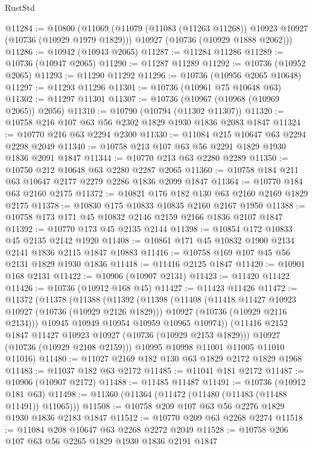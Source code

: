 \begin{lexlean}{RustStd}
\begin{coremodule}
@11284 := @10800
    (@11069
      (@11079 (@11083 (@11263 @11268)) @10923 @10927 (@10736 (@10929 @1979 @1829)))
      @10927
      (@10736 (@10929 @1888 @2062)))
@11286 := @10942 (@10943 @2065)
@11287 := @11284 @11286
@11289 := @10736 (@10947 @2065)
@11290 := @11287 @11289
@11292 := @10736 (@10952 @2065)
@11293 := @11290 @11292
@11296 := @10736 (@10956 @2065 @10648)
@11297 := @11293 @11296
@11301 := @10736 (@10961 @75 @10648 @63)
@11302 := @11297 @11301
@11307 := @10736 (@10967 (@10968 (@10969 @2065)) @2056)
@11310 := @10790 (@10794 (@11302 @11307))
@11320 := @10758 @216 @107 @63 @56 @2302 @1829 @1930 @1836 @2083 @1847
@11324 := @10770 @216 @63 @2294 @2300
@11330 := @11084 @215 @10647 @63 @2294 @2298 @2049
@11340 := @10758 @213 @107 @63 @56 @2291 @1829 @1930 @1836 @2091 @1847
@11344 := @10770 @213 @63 @2280 @2289
@11350 := @10750 @212 @10648 @63 @2280 @2287 @2065
@11360 := @10758 @184 @211 @63 @10647 @2177 @2279 @2286 @1836 @2099 @1847
@11364 := @10770 @184 @63 @2160 @2175
@11372 := @10821 @176 @182 @130 @63 @2160 @2169 @1829 @2175
@11378 := @10830 @175 @10833 @10835 @2160 @2167 @1950
@11388 := @10758 @173 @171 @45 @10832 @2146 @2159 @2166 @1836 @2107 @1847
@11392 := @10770 @173 @45 @2135 @2144
@11398 := @10854 @172 @10833 @45 @2135 @2142 @1920
@11408 := @10861 @171 @45 @10832 @1900 @2134 @2141 @1836 @2115 @1847 @10883
@11416 := @10758 @169 @107 @45 @56 @2131 @1829 @1930 @1836
@11418 := @11416 @2125 @1847
@11420 := @10901 @168 @2131
@11422 := @10906 (@10907 @2131)
@11423 := @11420 @11422
@11426 := @10736 (@10912 @168 @45)
@11427 := @11423 @11426
@11472 := @11372
    (@11378
      (@11388
        (@11392
          (@11398
            (@11408
              (@11418 @11427 @10923 @10927 (@10736 (@10929 @2126 @1829)))
              @10927
              (@10736 (@10929 @2116 @2134)))
            @10945
            @10949
            @10954
            @10959
            @10965
            @10974))
        (@11416 @2152 @1847 @11427 @10923 @10927 (@10736 (@10929 @2153 @1829)))
        @10927
        (@10736 (@10929 @2108 @2159)))
      @10995
      @10998
      @11001
      @11005
      @11010
      @11016)
@11480 := @11027 @2169 @182 @130 @63 @1829 @2172 @1829 @1968
@11483 := @11037 @182 @63 @2172
@11485 := @11041 @181 @2172
@11487 := @10906 (@10907 @2172)
@11488 := @11485 @11487
@11491 := @10736 (@10912 @181 @63)
@11498 := @11360 (@11364 (@11472 (@11480 (@11483 (@11488 @11491)) @11065)))
@11508 := @10758 @209 @107 @63 @56 @2276 @1829 @1930 @1836 @2183 @1847
@11512 := @10770 @209 @63 @2268 @2274
@11518 := @11084 @208 @10647 @63 @2268 @2272 @2049
@11528 := @10758 @206 @107 @63 @56 @2265 @1829 @1930 @1836 @2191 @1847

\end{coremodule}
\end{lexlean}
